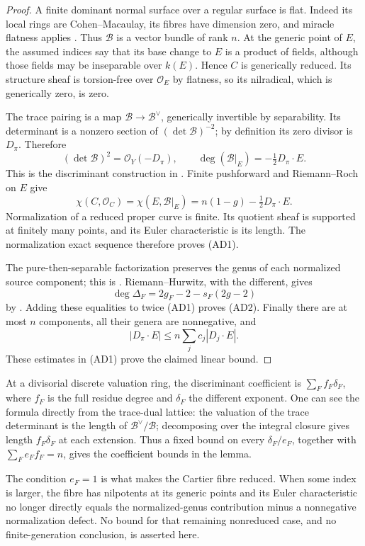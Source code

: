 \begin{proof}
A finite dominant normal surface over a regular surface is flat.
Indeed its local rings are Cohen--Macaulay, its fibres have
dimension zero, and miracle flatness applies
\cite[Tag 00R4]{StacksArithmeticDefectB}.
Thus \(\mathcal B\) is a vector bundle of rank \(n\).
At the generic point of \(E\), the assumed indices say that its
base change to \(E\) is a product of fields, although those fields
may be inseparable over \(k(E)\). Hence \(C\) is generically
reduced. Its structure sheaf is torsion-free over \(\mathcal O_E\)
by flatness, so its nilradical, which is generically zero, is zero.

The trace pairing is a map
\(\mathcal B\to\mathcal B^\vee\), generically invertible by
separability. Its determinant is a nonzero section of
\((\det\mathcal B)^{-2}\); by definition its zero divisor is
\(D_\pi\). Therefore
\[
 (\det\mathcal B)^2=\mathcal O_Y(-D_\pi),\qquad
 \deg(\mathcal B|_E)=-\tfrac12 D_\pi\cdot E.
\]
This is the discriminant construction in
\cite[Tag 0BVH]{StacksArithmeticDefectB}.
Finite pushforward and Riemann--Roch on \(E\) give
\[
 \chi(C,\mathcal O_C)
   =\chi(E,\mathcal B|_E)
   =n(1-g)-\tfrac12 D_\pi\cdot E.
\]
Normalization of a reduced proper curve is finite. Its quotient
sheaf is supported at finitely many points, and its Euler
characteristic is its length. The normalization exact sequence
therefore proves (AD1).

The pure-then-separable factorization preserves the genus of each
normalized source component; this is
\cite[Lemmas 53.13.4--53.13.5 and Proposition 53.13.7]
{StacksResidualGenusB}. Riemann--Hurwitz, with the different, gives
\[
 \deg\Delta_F=2g_F-2-s_F(2g-2)
\]
by \cite[Lemma 53.12.2]{StacksResidualGenusB}.
Adding these equalities to twice (AD1) proves (AD2).
Finally there are at most \(n\) components, all their genera are
nonnegative, and
\[
 |D_\pi\cdot E|\leq n\sum_jc_j|D_j\cdot E|.
\]
These estimates in (AD1) prove the claimed linear bound.
\end{proof}

\begin{remark}
At a divisorial discrete valuation ring, the discriminant
coefficient is \(\sum_F f_F\delta_F\), where \(f_F\) is the full
residue degree and \(\delta_F\) the different exponent.
One can see the formula directly from the trace-dual lattice:
the valuation of the trace determinant is the length of
\(\mathcal B^\vee/\mathcal B\); decomposing over the integral
closure gives length \(f_F\delta_F\) at each extension.
Thus a fixed bound on every \(\delta_F/e_F\), together with
\(\sum_Fe_Ff_F=n\), gives the coefficient bounds in the lemma.

The condition \(e_F=1\) is what makes the Cartier fibre reduced.
When some index is larger, the fibre has nilpotents at its
generic points and its Euler characteristic no longer directly
equals the normalized-genus contribution minus a nonnegative
normalization defect. No bound for that remaining nonreduced
case, and no finite-generation conclusion, is asserted here.
\end{remark}

